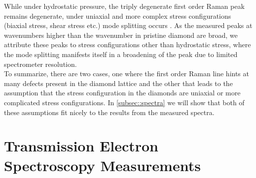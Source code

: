 		While under hydrostatic pressure, the triply degenerate first order Raman peak remains degenerate, under uniaxial and more complex stress configurations (biaxial stress, shear stress etc.) mode splitting occurs \cite{Prawer2004}.
		As the measured peaks at wavenumbers higher than the wavenumber in pristine diamond are broad, we attribute these peaks to stress configurations other than hydrostatic stress, where the mode splitting manifests itself in a broadening of the peak due to limited spectrometer resolution.
		\\
		To summarize, there are two cases, one where the first order Raman line hints at many defects present in the diamond lattice and the other that leads to the assumption that the stress configuration in the diamonds are uniaxial or more complicated stress configurations.
		In \autoref{subsec::spectra} we will show that both of these assumptions fit nicely to the results from the measured \pl spectra. 

	\section[TEM]{Transmission Electron Spectroscopy Measurements}{\label{sec::tem}}

